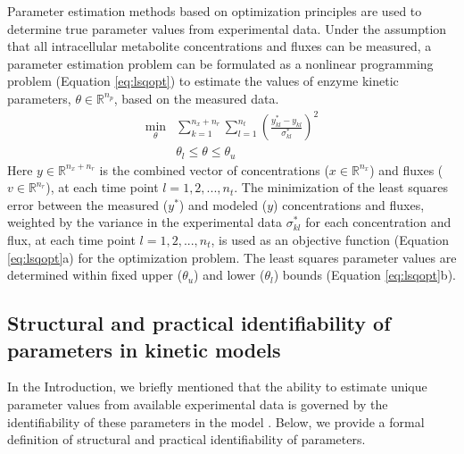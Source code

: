 \documentclass[10pt]{article}
\begin{document}
	Parameter estimation methods based on optimization principles are used to determine true parameter values from experimental data. Under the assumption that all intracellular metabolite concentrations and fluxes can be measured, a parameter estimation problem can be formulated as a nonlinear programming problem (Equation \ref{eq:lsqopt}) to estimate the values of enzyme kinetic parameters, $\theta \in \mathbb{R}^{n_p}$, based on the measured data. 
	\begin{subequations}\label{eq:lsqopt}
		\begin{align}
		\underset{\theta}{\mathrm{min}} &\sum_{k=1}^{n_x + n_r}\sum_{l=1}^{n_t}\left(\frac{y_{kl}^*-y_{kl}}{\sigma_{kl}^*}\right)^2\\
		&\theta_l \le \theta \le \theta_u
		\end{align}
	\end{subequations}
	Here $y \in \mathbb{R}^{n_x + n_r}$ is the combined vector of concentrations ($x\in \mathbb{R}^{n_x}$) and fluxes ($v \in \mathbb{R}^{n_r}$), at each time point $l={1, 2, ..., n_t}$. The minimization of the least squares error between the measured ($y^*$) and modeled ($y$) concentrations and fluxes, weighted by the variance in the experimental data $\sigma_{kl}^*$ for each concentration and flux, at each time point $l={1, 2, ..., n_t}$, is used as an objective function (Equation \ref{eq:lsqopt}a) for the optimization problem. The least squares parameter values are determined within fixed upper ($\theta_u$) and lower ($\theta_l$) bounds (Equation \ref{eq:lsqopt}b). 
	
	\subsection{Structural and practical identifiability of parameters in kinetic models}\label{sec:ident_def}
	In the Introduction, we briefly mentioned that the ability to estimate unique parameter values from available experimental data is governed by the identifiability of these parameters in the model \parencite{Ljung1994,Vanlier2012,Berthoumieux2013,Raue2014}. Below, we provide a formal definition of structural and practical identifiability of parameters.
	
\end{document}
